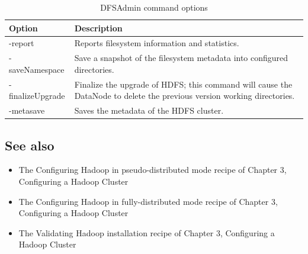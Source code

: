 \begin{table}
  \centering
  \begin{tabular}{lp{}}
    \toprule 
    \textbf{Option} & \textbf{Description} \\ \midrule 
    -report & Reports filesystem information and statistics. \\ 
    -saveNamespace & Save a snapshot of the filesystem metadata into configured directories. \\
    -finalizeUpgrade & Finalize the upgrade of HDFS; this command will cause the DataNode to delete the previous version working directories. \\
    -metasave & Saves the metadata of the HDFS cluster. \\ \bottomrule 
  \end{tabular}
  \caption{DFSAdmin command options}\label{tbl:dfsadmin}
\end{table}

\subsection*{See also}
\begin{itemize}
  \item The Configuring Hadoop in pseudo-distributed mode recipe of Chapter 3, Configuring a Hadoop Cluster
  \item The Configuring Hadoop in fully-distributed mode recipe of Chapter 3, Configuring a Hadoop Cluster
  \item The Validating Hadoop installation recipe of Chapter 3, Configuring a Hadoop Cluster
\end{itemize}

